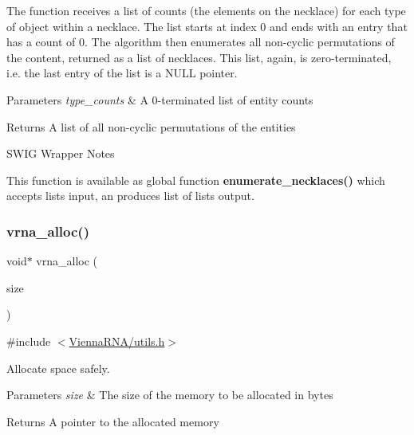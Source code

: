 The function receives a list of counts (the elements on the necklace) for each type of object within a necklace. The list starts at index 0 and ends with an entry that has a count of 0. The algorithm then enumerates all non-\/cyclic permutations of the content, returned as a list of necklaces. This list, again, is zero-\/terminated, i.\+e. the last entry of the list is a {\ttfamily N\+U\+LL} pointer.


\begin{DoxyParams}{Parameters}
{\em type\+\_\+counts} & A 0-\/terminated list of entity counts \\
\hline
\end{DoxyParams}
\begin{DoxyReturn}{Returns}
A list of all non-\/cyclic permutations of the entities
\end{DoxyReturn}
\begin{DoxyRefDesc}{S\+W\+I\+G Wrapper Notes}
\item[\hyperlink{wrappers__wrappers000003}{S\+W\+I\+G Wrapper Notes}]This function is available as global function {\bfseries enumerate\+\_\+necklaces()} which accepts lists input, an produces list of lists output. \end{DoxyRefDesc}
\mbox{\label{group__utils_gaf37a0979367c977edfb9da6614eebe99}} 
\subsubsection{\texorpdfstring{vrna\+\_\+alloc()}{vrna\_alloc()}}
{\footnotesize\ttfamily void$\ast$ vrna\+\_\+alloc (\begin{DoxyParamCaption}\item[{unsigned}]{size }\end{DoxyParamCaption})}



{\ttfamily \#include $<$\hyperlink{utils_8h}{Vienna\+R\+N\+A/utils.\+h}$>$}



Allocate space safely. 


\begin{DoxyParams}{Parameters}
{\em size} & The size of the memory to be allocated in bytes \\
\hline
\end{DoxyParams}
\begin{DoxyReturn}{Returns}
A pointer to the allocated memory 
\end{DoxyReturn}
\mbox{\label{group__utils_ga27f4719a66c6f90d1cca3d1e6e696c6a}} 
